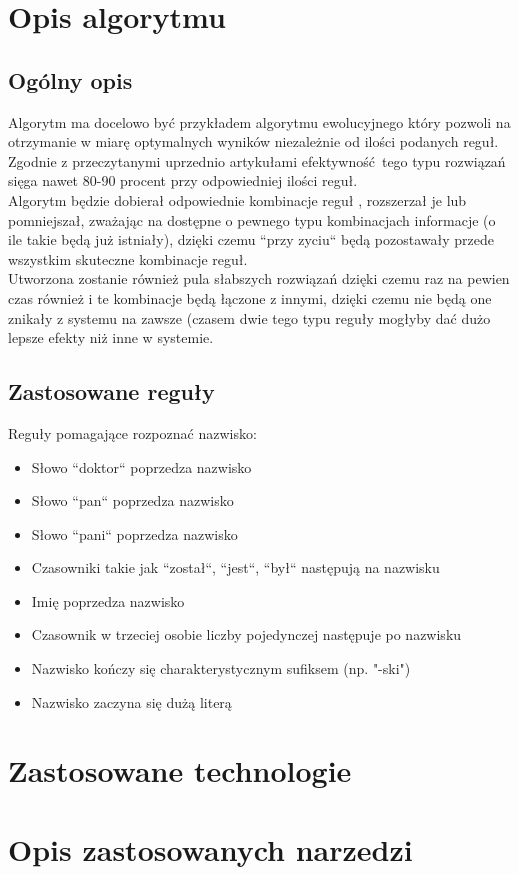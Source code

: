 \documentclass[12pt]{article}
\begin{document}
\section{Opis algorytmu}
\subsection{Ogólny opis}
Algorytm ma docelowo być przykładem algorytmu ewolucyjnego który pozwoli na otrzymanie w miarę optymalnych wyników niezależnie od ilości podanych reguł. Zgodnie z przeczytanymi uprzednio artykułami efektywność tego typu rozwiązań sięga nawet 80-90 procent przy odpowiedniej ilości reguł.
\\
Algorytm będzie dobierał odpowiednie kombinacje reguł , rozszerzał je lub pomniejszał, zważając na dostępne o pewnego typu kombinacjach informacje (o ile takie będą już istniały), dzięki czemu ``przy zyciu`` będą pozostawały przede wszystkim skuteczne kombinacje reguł.
\\
Utworzona zostanie również pula słabszych rozwiązań dzięki czemu raz na pewien czas również i te kombinacje będą łączone z innymi, dzięki czemu nie będą one znikały z systemu na zawsze (czasem dwie tego typu reguły mogłyby dać dużo lepsze efekty niż inne w systemie.
\subsection{Zastosowane reguły}
Reguły pomagające rozpoznać nazwisko:
\begin{itemize}
\item Słowo ``doktor`` poprzedza nazwisko
\item Słowo ``pan`` poprzedza nazwisko
\item Słowo ``pani`` poprzedza nazwisko
\item Czasowniki takie jak ``został``, ``jest``, ``był`` następują na nazwisku
\item Imię poprzedza nazwisko
\item Czasownik w trzeciej osobie liczby pojedynczej następuje po nazwisku
\item Nazwisko kończy się charakterystycznym sufiksem (np. "-ski")
\item Nazwisko zaczyna się dużą literą
\end{itemize}

\section{Zastosowane technologie}
\section{Opis zastosowanych narzedzi}
\end{document}
